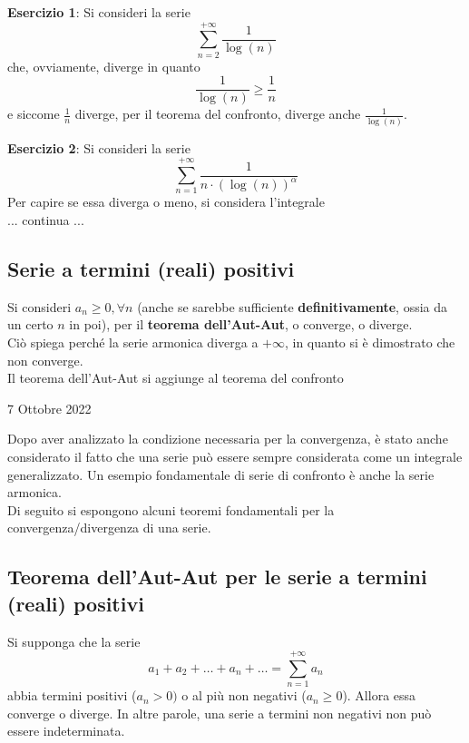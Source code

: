 \documentclass[a4paper]{extarticle}
\begin{document}
\vspace{1em}
\noindent
\textbf{Esercizio 1}: Si consideri la serie
\[\sum_{n=2}^{+\infty} \frac{1}{\log(n)}\]
che, ovviamente, diverge in quanto
\[\frac{1}{\log(n)} \geq \frac{1}{n}\]
e siccome $\frac{1}{n}$ diverge, per il teorema del confronto, diverge anche $\frac{1}{\log(n)}$.

\vspace{1em}
\noindent
\textbf{Esercizio 2}: Si consideri la serie
\[\sum_{n=1}^{+\infty} \frac{1}{n \cdot (\log(n))^\alpha}\]
Per capire se essa diverga o meno, si considera l'integrale
\[\]
... continua ...

\vspace{1em}
\noindent
\subsection{Serie a termini (reali) positivi}
Si consideri $a_n \geq 0, \forall n$ (anche se sarebbe sufficiente \textbf{definitivamente}, ossia da un certo $n$ in poi), per il \textbf{teorema dell'Aut-Aut}, o converge, o diverge.\\
Ciò spiega perché la serie armonica diverga a $+\infty$, in quanto si è dimostrato che non converge.\\
Il teorema dell'Aut-Aut si aggiunge al teorema del confronto

\newpage
\noindent
\begin{center}
    7 Ottobre 2022
\end{center}
\noindent
Dopo aver analizzato la condizione necessaria per la convergenza, è stato anche considerato il fatto che una serie può essere sempre considerata come un integrale generalizzato. Un esempio fondamentale di serie di confronto è anche la serie armonica.\\
Di seguito si espongono alcuni teoremi fondamentali per la convergenza/divergenza di una serie.

\vspace{1em}
\noindent
\subsection{Teorema dell'Aut-Aut per le serie a termini (reali) positivi}
Si supponga che la serie
\[a_1+a_2+\dots+a_n+\dots=\sum_{n=1}^{+\infty} a_n\]
abbia termini positivi ($a_n > 0)$ o al più non negativi ($a_n \geq 0$). Allora essa converge o diverge. In altre parole, una serie a termini non negativi non può essere indeterminata.
\end{document}
